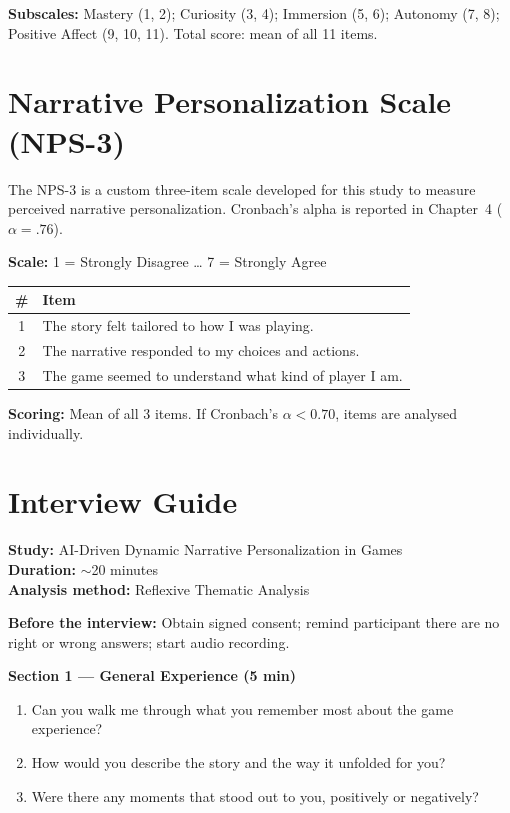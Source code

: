 \textbf{Subscales:} Mastery (1, 2); Curiosity (3, 4); Immersion (5, 6); Autonomy (7, 8); Positive Affect (9, 10, 11). Total score: mean of all 11 items.


\chapter{Narrative Personalization Scale (NPS-3)}
\label{app:nps3}

The NPS-3 is a custom three-item scale developed for this study to measure perceived narrative personalization. Cronbach's alpha is reported in Chapter~4 ($\alpha = .76$).

\textbf{Scale:} 1 = Strongly Disagree \ldots{} 7 = Strongly Agree

\begin{longtable}{@{}cl@{}}
\toprule
\textbf{\#} & \textbf{Item} \\
\midrule
\endfirsthead
1 & The story felt tailored to how I was playing. \\
2 & The narrative responded to my choices and actions. \\
3 & The game seemed to understand what kind of player I am. \\
\bottomrule
\end{longtable}

\textbf{Scoring:} Mean of all 3 items. If Cronbach's $\alpha < 0.70$, items are analysed individually.


\chapter{Interview Guide}
\label{app:interview}

\textbf{Study:} AI-Driven Dynamic Narrative Personalization in Games \\
\textbf{Duration:} $\sim$20 minutes \\
\textbf{Analysis method:} Reflexive Thematic Analysis \citep{braun2022thematic}

\textbf{Before the interview:} Obtain signed consent; remind participant there are no right or wrong answers; start audio recording.

\vspace{0.5cm}
\textbf{Section 1 --- General Experience (5 min)}
\begin{enumerate}
\item Can you walk me through what you remember most about the game experience?
\item How would you describe the story and the way it unfolded for you?
\item Were there any moments that stood out to you, positively or negatively?
\end{enumerate}

